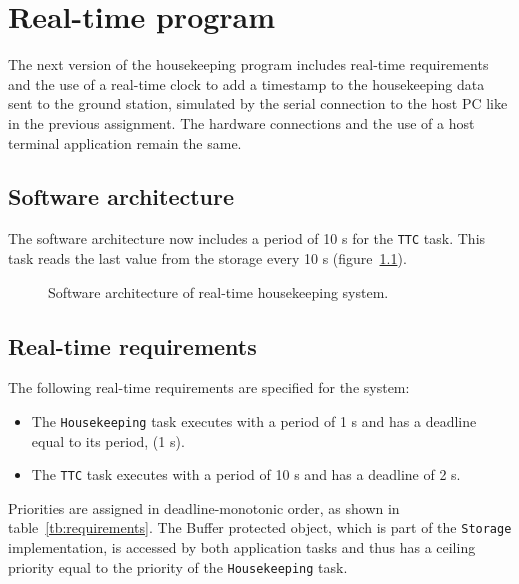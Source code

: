 \chapter{Real-time program}\label{ch:Assignment6}

The next version of the housekeeping program includes real-time requirements and the use of a real-time clock to add a timestamp to the housekeeping data sent to the ground station, simulated by the serial connection to the host PC like in the previous assignment. The hardware connections and the use of a host terminal application remain the same.

\section{Software architecture}

The software architecture now includes a period of 10 s for the {\tt TTC} task. This task reads the last value from the storage every 10 s (figure~\ref{fig:real-time}).

\begin{figure}[h]
            \caption{Software architecture of real-time housekeeping system.}
            \label{fig:real-time}
\end{figure}

\section{Real-time requirements}

The following real-time requirements are specified for the system:
\begin{itemize}
\item The {\tt Housekeeping} task executes with a period of 1 s and has a deadline equal to its period, (1 s).
\item The {\tt TTC} task executes with a period of 10 s and has a deadline of 2 s.
\end{itemize}

Priorities are assigned in deadline-monotonic order, as shown in table~\ref{tb:requirements}. The Buffer protected object, which is part of the {\tt Storage} implementation, is accessed by both application tasks and thus has a ceiling priority equal to the priority of the {\tt Housekeeping} task.


